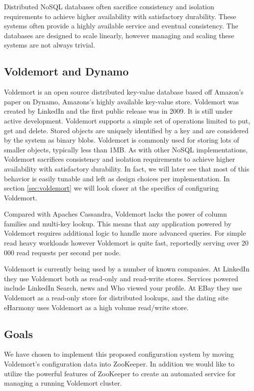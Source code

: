 Distributed NoSQL databases often sacrifice consistency and isolation requirements to achieve higher availability with satisfactory durability. These systems often provide a highly available service and eventual consistency.
The databases are designed to scale linearly, however managing and scaling these systems are not always trivial\cite{tellybug}. 


\subsection{Voldemort and Dynamo}
Voldemort is an open source distributed key-value database based off Amazon's paper on Dynamo, Amazons's highly available key-value store. Voldemort was created by LinkedIn and the first public release was in 2009. It is still under active development. Voldemort supports a simple set of operations limited to put, get and delete. Stored objects are uniquely identified by a key and are considered by the system as binary blobs. Voldemort is commonly used for storing lots of smaller objects, typically less than 1MB.  As with other NoSQL implementations, Voldemort sacrifices consistency and isolation requirements to achieve higher availability with satisfactory durability. In fact, we will later see that most of this behavior is easily tunable and left as design choices per implementation. In section \ref{sec:voldemort} we will look closer at the specifics of configuring Voldemort. 

Compared with Apaches Cassandra, Voldemort lacks the power of column families and multi-key lookup. This means that any application powered by Voldemort requires additional logic to handle more advanced queries. For simple read heavy workloads however Voldemort is quite fast, reportedly serving over 20 000 read requests per second per node\cite{voldemort}. 

Voldemort is currently being used by a number of known companies. At LinkedIn they use Voldemort both as read-only and read-write stores. Services powered include LinkedIn Search, news and Who viewed your profile. At EBay they use Voldemort as a read-only store for distributed lookups, and the dating site eHarmony uses Voldemort as a high volume read/write store.


\subsection{Goals}
We have chosen to implement this proposed configuration system by moving Voldemort's configuration data into ZooKeeper. In addition we would like to utilize the powerful features of ZooKeeper to create an automated service for managing a running Voldemort cluster. 

